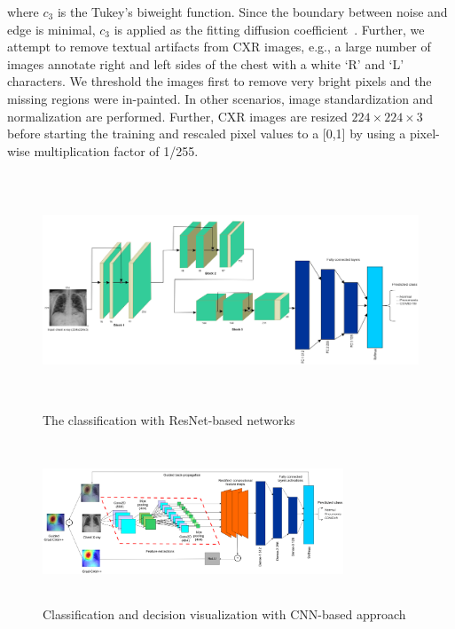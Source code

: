 \documentclass[conference]{IEEEtran}
\begin{document}
\noindent where $c_{3}$ is the Tukey's biweight function. Since the boundary between noise and edge is minimal, $c_{3}$ is applied as the fitting diffusion coefficient~\cite{95}. Further, we attempt to remove textual artifacts from CXR images, e.g., a large number of images annotate right and left sides of the chest with a white `R' and `L' characters. We threshold the images first to remove very bright pixels and the missing regions were in-painted. In other scenarios, image standardization and normalization are performed. 
Further, CXR images are resized $224 \times 224 \times 3$ before starting the training and rescaled pixel values to a [0,1] by using a pixel-wise multiplication factor of 1/255. %

\begin{figure}
	\centering
	\includegraphics[width=0.9\linewidth,height=70mm]{densenet.png}
	\caption{The classification with ResNet-based networks} 
	\label{fig:resnet}
\end{figure}
\fi

\begin{figure}[h]
	\centering
	\includegraphics[width=0.8\textwidth,height=48mm]{wf.png}
    \caption{Classification and decision visualization with CNN-based approach}	
	\label{fig:viz}
	\vspace{-2mm}
\end{figure}
\end{document}
